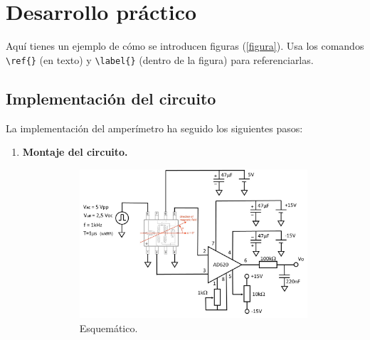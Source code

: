 \section{Desarrollo práctico}

Aquí tienes un ejemplo de cómo se introducen figuras (\ref{figura}). Usa los comandos \verb|\ref{}| (en texto) y \verb|\label{}| (dentro de la figura) para referenciarlas.

\subsection{Implementación del circuito}

La implementación del amperímetro ha seguido los siguientes pasos:

\begin{enumerate}
    \item \textbf{Montaje del circuito.} \\
    \begin{figure}[htb]
        \centering
        \begin{subfigure}{0.52\textwidth}
            \centering
            \includegraphics[width=\textwidth]{img/esquema.png}
            \caption{Esquemático.}
        \end{subfigure}
        \begin{subfigure}{0.47\textwidth}
            \centering

\end{subfigure}
\end{figure}
\end{enumerate}
